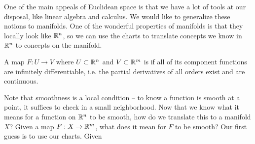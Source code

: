 %
One of the main appeals of Euclidean space is that we have a lot of tools at our disposal, like linear algebra
and calculus. We would like to generalize these notions to manifolds. One of the wonderful properties of 
manifolds is that they locally look like $\mathbb{R}^n$, so we can use the charts to translate concepts we know in 
$\mathbb{R}^n$ to concepts on the manifold. 
%
\begin{defn}
	A map $F : U \to V$ where $U \subset \mathbb{R}^n$ and $V \subset \mathbb{R}^m$ is  if all of its 
	component functions are infinitely differentiable, i.e. the partial derivatives of all orders 
	exist and are continuous.
\end{defn}
%
Note that smoothness is a local condition -- to know a function is smooth at a point, it suffices to check 
in a small neighborhood. Now that we know what it means for a function on $\mathbb{R}^n$ to be smooth, how do we 
translate this to a manifold $X$? Given a map $F : X \to \mathbb{R}^m$, what does it mean for $F$ to be smooth? Our 
first guess is to use our charts. Given 

